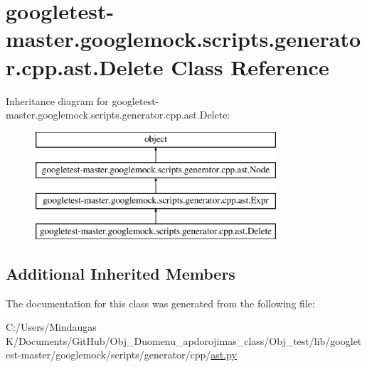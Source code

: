 \hypertarget{classgoogletest-master_1_1googlemock_1_1scripts_1_1generator_1_1cpp_1_1ast_1_1_delete}{}\section{googletest-\/master.googlemock.\+scripts.\+generator.\+cpp.\+ast.\+Delete Class Reference}
\label{classgoogletest-master_1_1googlemock_1_1scripts_1_1generator_1_1cpp_1_1ast_1_1_delete}
Inheritance diagram for googletest-\/master.googlemock.\+scripts.\+generator.\+cpp.\+ast.\+Delete\+:\begin{figure}[H]
\begin{center}
\leavevmode
\includegraphics[height=4.000000cm]{d3/d35/classgoogletest-master_1_1googlemock_1_1scripts_1_1generator_1_1cpp_1_1ast_1_1_delete}
\end{center}
\end{figure}
\subsection*{Additional Inherited Members}


The documentation for this class was generated from the following file\+:\begin{DoxyCompactItemize}
\item 
C\+:/\+Users/\+Mindaugas K/\+Documents/\+Git\+Hub/\+Obj\+\_\+\+Duomenu\+\_\+apdorojimas\+\_\+class/\+Obj\+\_\+test/lib/googletest-\/master/googlemock/scripts/generator/cpp/\mbox{\hyperlink{_obj__test_2lib_2googletest-master_2googlemock_2scripts_2generator_2cpp_2ast_8py}{ast.\+py}}\end{DoxyCompactItemize}
